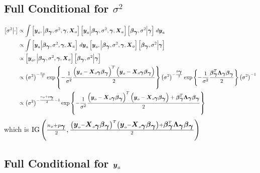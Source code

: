 \documentclass[fleqn]{article}
\def\bm#1{\mbox{\boldmath $#1$}}
\begin{document}
\subsection{Full Conditional for $\sigma^2$}
%
\begin{align*}
%
\left[ \sigma^2 \middle| \cdot \right] & \propto \int \left[ \bm{y}_o, \middle| \bm{\beta}_{\bm{\gamma}}, \sigma^2, \bm{\gamma}, \bm{X}_o \right] \left[ \bm{y}_a \middle| \bm{\beta}_{\bm{\gamma}}, \sigma^2, \bm{\gamma}, \bm{X}_a \right] \left[ \bm{\beta}_{\bm{\gamma}}, \sigma^2 \middle| \bm{\gamma} \right] \, d \bm{y}_a\\
%
 & \propto \int \left[ \bm{y}_a \middle| \bm{\beta}_{\bm{\gamma}}, \sigma^2, \bm{\gamma}, \bm{X}_a \right] \, d \bm{y}_a \left[ \bm{y}_o, \middle| \bm{\beta}_{\bm{\gamma}}, \sigma^2, \bm{\gamma}, \bm{X}_o \right] \left[ \bm{\beta}_{\bm{\gamma}}, \sigma^2 \middle| \bm{\gamma} \right] \\
%
 & \propto \left[ \bm{y}_o, \middle| \bm{\beta}_{\bm{\gamma}}, \sigma^2, \bm{\gamma}, \bm{X}_o \right] \left[ \bm{\beta}_{\bm{\gamma}}, \sigma^2 \middle| \bm{\gamma} \right] \\
%
 & \propto \left( \sigma^2 \right)^{ - \frac{n_o} {2}} \exp{\left\{ - \frac{1} {\sigma^2} \frac{ \left( \bm{y}_o - \bm{X}_{o \bm{\gamma}} \bm{\beta}_{\bm{\gamma}} \right)^T \left( \bm{y}_o - \bm{X}_{o \bm{\gamma}} \bm{\beta}_{\bm{\gamma}} \right) } {2} \right\} } \left( \sigma^2 \right)^{ - \frac{p_{\bm{\gamma}}} {2}} \exp{ \left\{ - \frac{1} {\sigma^2} \frac{\bm{\beta}_{\bm{\gamma}}^T \bm{\Lambda}_{\bm{\gamma}} \bm{\beta}_{\bm{\gamma}}} {2} \right\} } \left( \sigma^2 \right)^{ - 1}\\
%
 & \propto \left( \sigma^2 \right)^{ - \frac{n_o + p_{\bm{\gamma}}} {2} - 1} \exp{\left\{ - \frac{1} {\sigma^2} \frac{ \left( \bm{y}_o - \bm{X}_{o \bm{\gamma}} \bm{\beta}_{\bm{\gamma}} \right)^T \left( \bm{y}_o - \bm{X}_{o \bm{\gamma}} \bm{\beta}_{\bm{\gamma}} \right) + \bm{\beta}_{\bm{\gamma}}^T \bm{\Lambda}_{\bm{\gamma}} \bm{\beta}_{\bm{\gamma}} } {2} \right\} } 
%
\end{align*}
%
which is $\mbox{IG} \left( \frac{n_o + p_{\bm{\gamma}}} {2}, \frac{\left( \bm{y}_o - \bm{X}_{o \bm{\gamma}} \bm{\beta}_{\bm{\gamma}} \right)^T \left( \bm{y}_o - \bm{X}_{o \bm{\gamma}} \bm{\beta}_{\bm{\gamma}} \right) + \bm{\beta}_{\bm{\gamma}}^T \bm{\Lambda}_{\bm{\gamma}} \bm{\beta}_{\bm{\gamma}}} {2} \right)$
\subsection{Full Conditional for $\bm{y}_a$}
%
\end{document}
